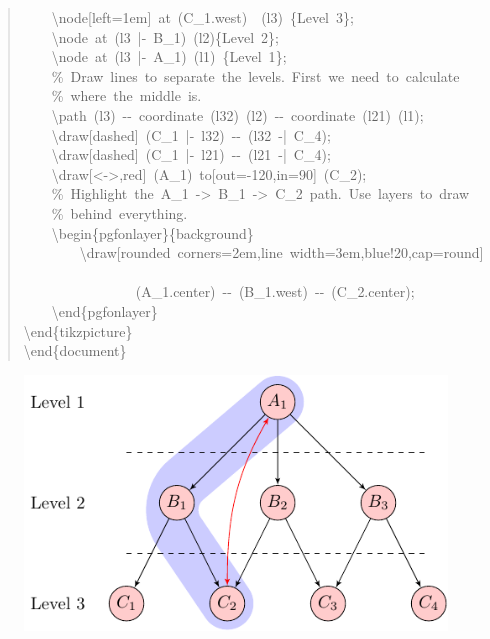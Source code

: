 \documentclass[10pt,a4paper,english]{article}
\begin{document}
\begin{quote}
{~~~~{\textbackslash}node{[}left=1em{]}~at~(C{\_}1.west)~~(l3)~{\{}Level~3{\}};~\\
~~~~{\textbackslash}node~at~(l3~|-~B{\_}1)~(l2){\{}Level~2{\}};~\\
~~~~{\textbackslash}node~at~(l3~|-~A{\_}1)~(l1)~{\{}Level~1{\}};~\\
~~~~{\%}~Draw~lines~to~separate~the~levels.~First~we~need~to~calculate~\\
~~~~{\%}~where~the~middle~is.~\\
~~~~{\textbackslash}path~(l3)~-{}-~coordinate~(l32)~(l2)~-{}-~coordinate~(l21)~(l1);~\\
~~~~{\textbackslash}draw{[}dashed{]}~(C{\_}1~|-~l32)~-{}-~(l32~-|~C{\_}4);~\\
~~~~{\textbackslash}draw{[}dashed{]}~(C{\_}1~|-~l21)~-{}-~(l21~-|~C{\_}4);~\\
~~~~{\textbackslash}draw{[}<->,red{]}~(A{\_}1)~to{[}out=-120,in=90{]}~(C{\_}2);~\\
~~~~{\%}~Highlight~the~A{\_}1~->~B{\_}1~->~C{\_}2~path.~Use~layers~to~draw~\\
~~~~{\%}~behind~everything.~\\
~~~~{\textbackslash}begin{\{}pgfonlayer{\}}{\{}background{\}}~\\
~~~~~~~~{\textbackslash}draw{[}rounded~corners=2em,line~width=3em,blue!20,cap=round{]}~\\
~~~~~~~~~~~~~~~~(A{\_}1.center)~-{}-~(B{\_}1.west)~-{}-~(C{\_}2.center);~\\
~~~~{\textbackslash}end{\{}pgfonlayer{\}}~\\
{\textbackslash}end{\{}tikzpicture{\}}~\\
{\textbackslash}end{\{}document{\}}
}\end{quote}
\begin{figure}[H]
\centering

\includegraphics{pdf/dot2texiex2}
\end{figure}
\end{document}
